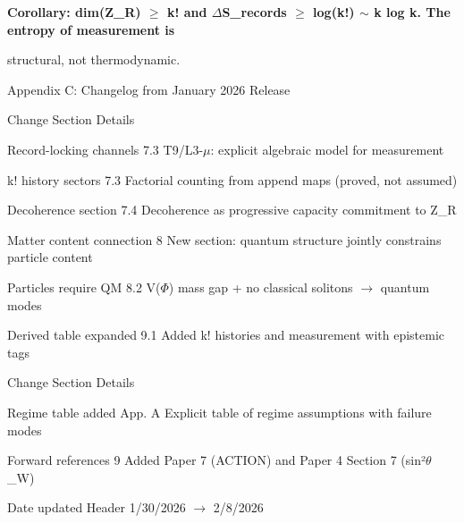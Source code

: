 \documentclass[11pt]{article}
\begin{document}
\textbf{Corollary: dim(Z_R) $\geq$ k! and $\Delta$S_records $\geq$ log(k!) $\sim$ k log k. The entropy of measurement is}

structural, not thermodynamic.



Appendix C: Changelog from January 2026 Release

Change                              Section      Details



Record-locking channels             7.3          T9/L3-$\mu$: explicit algebraic model for measurement



k! history sectors                  7.3          Factorial counting from append maps (proved, not assumed)



Decoherence section                 7.4          Decoherence as progressive capacity commitment to Z_R



Matter content connection           8            New section: quantum structure jointly constrains particle content



Particles require QM                8.2          V($\Phi$) mass gap + no classical solitons $\to$ quantum modes



Derived table expanded              9.1          Added k! histories and measurement with epistemic tags



Change                              Section       Details



Regime table added                  App. A        Explicit table of regime assumptions with failure modes



Forward references                  9             Added Paper 7 (ACTION) and Paper 4 Section 7 (sin²$\theta$_W)



Date updated                        Header        1/30/2026 $\to$ 2/8/2026
\end{document}
